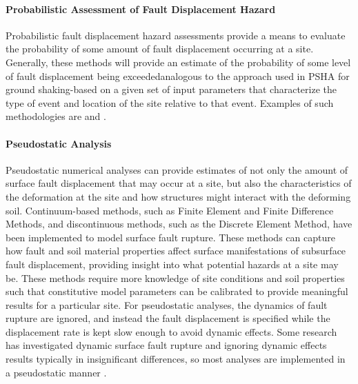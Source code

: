 \paragraph{Probabilistic Assessment of Fault Displacement Hazard}
Probabilistic fault displacement hazard assessments provide a means to evaluate the probability of some amount of fault displacement occurring at a site. Generally, these methods will provide an estimate of the probability of some level of fault displacement being exceeded\textemdash analogous to the approach used in PSHA for ground shaking-based on a given set of input parameters that characterize the type of event and location of the site relative to that event. Examples of such methodologies are \cite{youngs2003methodology, petersen2011fault, moss2011probabilistic} and \cite{hecker2013variability}.

\paragraph{Pseudostatic Analysis}
Pseudostatic numerical analyses can provide estimates of not only the amount of surface fault displacement that may occur at a site, but also the characteristics of the deformation at the site and how structures might interact with the deforming soil. Continuum-based methods, such as Finite Element and Finite Difference Methods, and discontinuous methods, such as the Discrete Element Method, have been implemented to model surface fault rupture. These methods can capture how fault and soil material properties affect surface manifestations of subsurface fault displacement, providing insight into what potential hazards at a site may be. These methods require more knowledge of site conditions and soil properties such that constitutive model parameters can be calibrated to provide meaningful results for a particular site. For pseudostatic analyses, the dynamics of fault rupture are ignored, and instead the fault displacement is specified while the displacement rate is kept slow enough to avoid dynamic effects. Some research has investigated dynamic surface fault rupture \citep{oettle2015dynamic} and ignoring dynamic effects results typically in insignificant differences, so most analyses are implemented in a pseudostatic manner \citep{anastasopoulos2007foundation, anastasopoulos2008numerical, bransby2008centrifuge_reverse, bransby2008centrifuge, oettle2013geotechnical, oettle2017numerical, garcia2018distinct, garcia2018distinct_2}.

